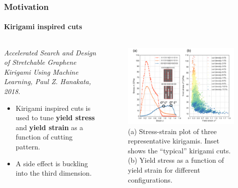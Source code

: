 \documentclass[
	10pt, %
]{beamer}
\begin{document}
\begin{frame}
	\frametitle{Motivation}
	\framesubtitle{Kirigami inspired cuts}

	


	\begin{columns}[t] %
		\begin{column}{0.35\textwidth} %
			\newline
			\newline
			\textit{Accelerated Search and Design of Stretchable Graphene Kirigami Using Machine Learning, Paul Z. Hanakata, 2018.} \\
			\begin{itemize}
				\item Kirigami inspired cuts is used to tune \textbf{yield stress} and \textbf{yield strain} as a function of cutting pattern.
				\item A side effect is buckling into the third dimension.
			\end{itemize}
		\end{column}
		\begin{column}{0.65\textwidth} %
			\vspace*{-0.7cm}
			\begin{figure}
				\includegraphics[width=\linewidth]{Hanakata2.png}
				\caption{(a) Stress-strain plot of three representative kirigamis. Inset shows the “typical” kirigami cuts. (b) Yield stress as a function of yield strain for different configurations.}
			\end{figure}
		\end{column}
	\end{columns}


\end{frame}
\end{document}
